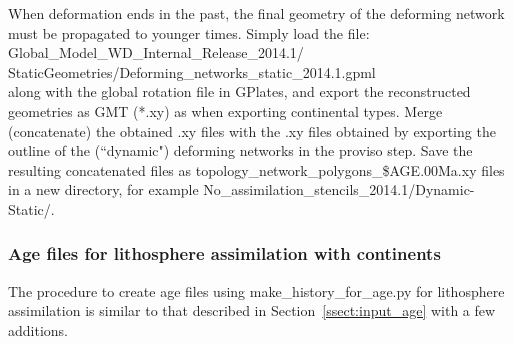 \documentclass[letterpaper,12pt]{article}
\newcommand{\gp}[1]{\textbf{#1}}
\newcommand{\gplatesmodel}{Global\_Model\_WD\_Internal\_Release\_2014.1/ }
\begin{document}
When deformation ends in the past, the final geometry of the deforming network must be propagated to younger times.
Simply load the file:\\
\gplatesmodel StaticGeometries/Deforming\_networks\_static\_2014.1.gpml\\
along with the global rotation file in GPlates, and export the reconstructed geometries as GMT (*.xy) as when exporting continental types.
Merge (concatenate) the obtained .xy files with the .xy files obtained by exporting the outline of the (``dynamic") deforming networks in the proviso step. Save the resulting concatenated files as topology\_network\_polygons\_\$AGE.00Ma.xy files in a new directory, for example No\_assimilation\_stencils\_2014.1/Dynamic-Static/.
%
%

\subsubsection{Age files for lithosphere assimilation with continents}
\label{sssect:input_age_cont}

The procedure to create age files using make\_history\_for\_age.py for lithosphere assimilation is similar to that described in Section~\ref{ssect:input_age} with a few additions.
\end{document}
